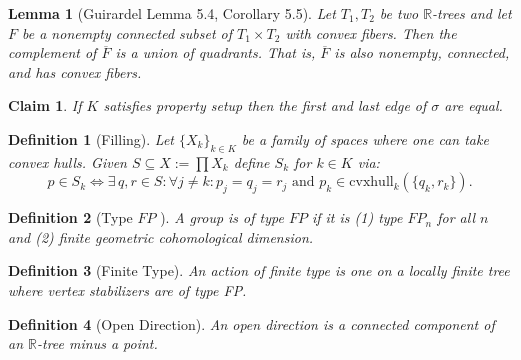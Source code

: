 \documentclass{article}
\theoremstyle{mystyle}
\newtheorem{lem}{Lemma}[section]
\newtheorem{defn}{Definition}
\newtheorem*{claim*}{Claim}
\theoremstyle{remark}
\begin{document}
\begin{lem}
	[Guirardel Lemma 5.4, Corollary 5.5]
 \label{lem:guirardel} 
	Let \(T_{1} , T_{2}\) be two \(\mathbb{R}\)-trees and let \(F\) be a nonempty connected subset of \(T_{1} \times T_{2}\) with convex fibers. Then the complement of \(\overline{F}\) is a union of quadrants. That is, \(\overline{F}\) is also nonempty, connected, and has convex fibers.
\end{lem}
\begin{claim*}
    If \(K\) satisfies property setup then the first and last edge of \(\sigma\) are equal.
\end{claim*}
\begin{defn}
	[Filling]
    Let \(\{X_{k}\}_{k \in K}\) be a family of spaces where one can take convex hulls. Given \(S \subseteq X := \prod X_{k}\) define \(S_{k}\) for \(k \in K\) via: \[p \in S_{k} \iff \exists \,q,r \in S: \forall j \neq k: p_{j} = q_{j} = r_{j} \text{ and } p_{k} \in \text{cvxhull}_k (\{q_{k} , r_{k}\}).\] 
\end{defn}
\begin{defn}
	[Type \(FP\) ]
	A group is of type \(FP\) if it is (1) type \(FP_n\) for all \(n\) and (2) finite geometric cohomological dimension.
\end{defn}

\begin{defn}
	[Finite Type] 
	An action of {\em finite type} is one on a locally finite tree where  vertex stabilizers are of type FP.
\end{defn}

\begin{defn}[Open Direction] An open direction is a connected component of an \(\mathbb{R}\)-tree minus a point. 
\end{defn}
\end{document}
